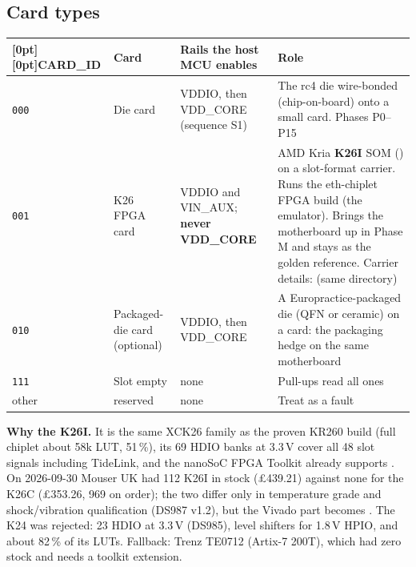 \documentclass[10pt,a4paper]{article}
\newcommand\hd[1]{\textbf{#1}}
\begin{document}
\subsection{Card types}
{\small
\begin{longtable}{@{}P{1.4cm}P{3.2cm}P{3.9cm}P{6.6cm}@{}}
\toprule
{}[0pt][0pt]\hd{CARD\_ID} & \hd{Card} & \hd{Rails the host MCU enables} & \hd{Role}\\
\midrule
\endhead
\texttt{000} & Die card & VDDIO, then VDD\_CORE (sequence S1) & The rc4 die wire-bonded (chip-on-board) onto a small card. Phases P0--P15 \\
\texttt{001} & K26 FPGA card & VDDIO and VIN\_AUX; \textbf{never VDD\_CORE} & AMD Kria \textbf{K26I} SOM () on a slot-format carrier. Runs the eth-chiplet FPGA build (the emulator). Brings the motherboard up in Phase M and stays as the golden reference. Carrier details:  (same directory) \\
\texttt{010} & Packaged-die card (optional) & VDDIO, then VDD\_CORE & A Europractice-packaged die (QFN or ceramic) on a card: the packaging hedge on the same motherboard \\
\texttt{111} & Slot empty & none & Pull-ups read all ones \\
other & reserved & none & Treat as a fault \\
\bottomrule
\end{longtable}\addtocounter{table}{-1}}

\textbf{Why the K26I.} It is the same XCK26 family as the proven KR260 build (full chiplet about 58k LUT, 51\,\%), its 69 HDIO banks at 3.3\,V cover all 48 slot signals including TideLink, and the nanoSoC FPGA Toolkit already supports . On 2026-09-30 Mouser UK had 112 K26I in stock (£439.21) against none for the K26C (£353.26, 969 on order); the two differ only in temperature grade and shock/vibration qualification (DS987 v1.2), but the Vivado part becomes . The K24 was rejected: 23 HDIO at 3.3\,V (DS985), level shifters for 1.8\,V HPIO, and about 82\,\% of its LUTs. Fallback: Trenz TE0712 (Artix-7 200T), which had zero stock and needs a toolkit  extension.
\end{document}
